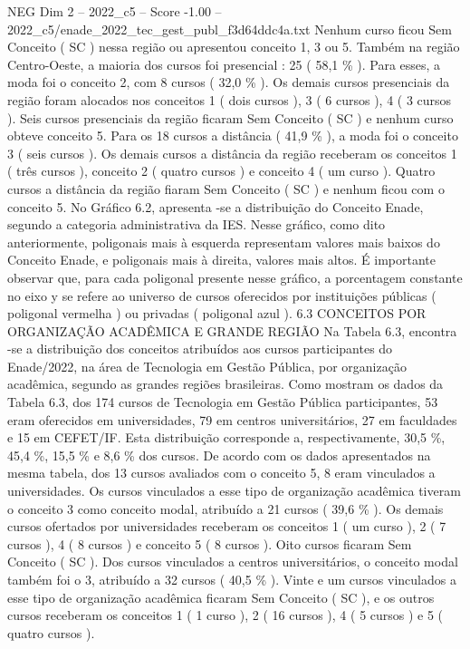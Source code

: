 \begin{textsample}{NEG Dim 2 – 2022\_c5 – Score -1.00 – 2022\_c5/enade\_2022\_tec\_gest\_publ\_f3d64ddc4a.txt}
Nenhum curso ficou Sem Conceito ( SC ) nessa região ou apresentou conceito 1, 3 ou 5.
Também na região Centro-Oeste, a maioria dos cursos foi presencial : 25 ( 58,1 \% ).
Para esses, a moda foi o conceito 2, com 8 cursos ( 32,0 \% ).
Os demais cursos presenciais da região foram alocados nos conceitos 1 ( dois cursos ), 3 ( 6 cursos ), 4 ( 3 cursos ).
Seis cursos presenciais da região ficaram Sem Conceito ( SC ) e nenhum curso obteve conceito 5.
Para os 18 cursos a distância ( 41,9 \% ), a moda foi o conceito 3 ( seis cursos ).
Os demais cursos a distância da região receberam os conceitos 1 ( três cursos ), conceito 2 ( quatro cursos ) e conceito 4 ( um curso ).
Quatro cursos a distância da região fiaram Sem Conceito ( SC ) e nenhum ficou com o conceito 5.
No Gráfico 6.2, apresenta -se a distribuição do Conceito Enade, segundo a categoria administrativa da IES.
Nesse gráfico, como dito anteriormente, poligonais mais à esquerda representam valores mais baixos do Conceito Enade, e poligonais mais à direita, valores mais altos.
É importante observar que, para cada poligonal presente nesse gráfico, a porcentagem constante no eixo y se refere ao universo de cursos oferecidos por instituições públicas ( poligonal vermelha ) ou privadas ( poligonal azul ). 6.3 CONCEITOS POR ORGANIZAÇÃO ACADÊMICA E GRANDE REGIÃO Na Tabela 6.3, encontra -se a distribuição dos conceitos atribuídos aos cursos participantes do Enade/2022, na área de Tecnologia em Gestão Pública, por organização acadêmica, segundo as grandes regiões brasileiras.
Como mostram os dados da Tabela 6.3, dos 174 cursos de Tecnologia em Gestão Pública participantes, 53 eram oferecidos em universidades, 79 em centros universitários, 27 em faculdades e 15 em CEFET/IF.
Esta distribuição corresponde a, respectivamente, 30,5 \%, 45,4 \%, 15,5 \% e 8,6 \% dos cursos.
De acordo com os dados apresentados na mesma tabela, dos 13 cursos avaliados com o conceito 5, 8 eram vinculados a universidades.
Os cursos vinculados a esse tipo de organização acadêmica tiveram o conceito 3 como conceito modal, atribuído a 21 cursos ( 39,6 \% ).
Os demais cursos ofertados por universidades receberam os conceitos 1 ( um curso ), 2 ( 7 cursos ), 4 ( 8 cursos ) e conceito 5 ( 8 cursos ).
Oito cursos ficaram Sem Conceito ( SC ).
Dos cursos vinculados a centros universitários, o conceito modal também foi o 3, atribuído a 32 cursos ( 40,5 \% ).
Vinte e um cursos vinculados a esse tipo de organização acadêmica ficaram Sem Conceito ( SC ), e os outros cursos receberam os conceitos 1 ( 1 curso ), 2 ( 16 cursos ), 4 ( 5 cursos ) e 5 ( quatro cursos ).

\end{textsample}
